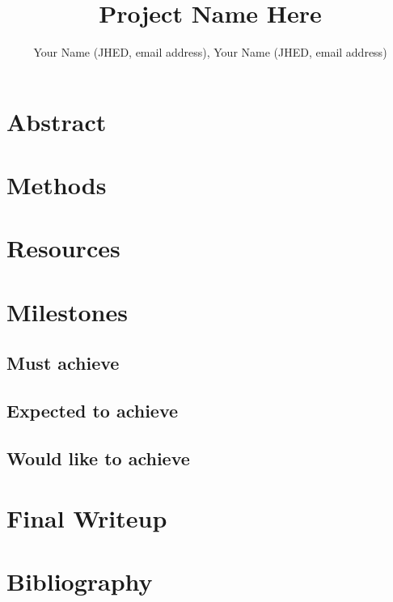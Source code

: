 \documentclass[11pt]{article}
\title{Project Name Here}
\author{Your Name (JHED, email address), Your Name (JHED, email address)}
\date{}
\begin{document}
\maketitle

\section{Abstract}

\section{Methods}

\section{Resources}

\section{Milestones}
\subsection{Must achieve}

\subsection{Expected to achieve}

\subsection{Would like to achieve}


\section{Final Writeup}

\section{Bibliography}
\end{document}
